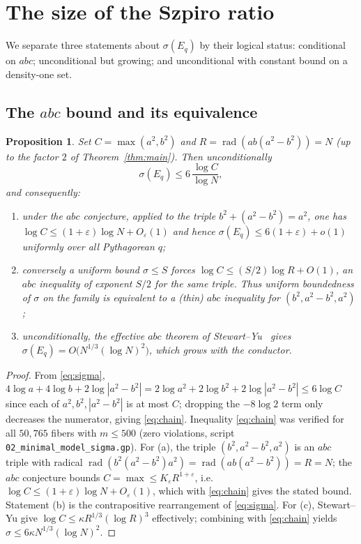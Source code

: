 \documentclass[11pt,reqno]{amsart}
\theoremstyle{plain}
\newtheorem{proposition}[theorem]{Proposition}
\theoremstyle{definition}
\newcommand{\rad}{\operatorname{rad}}
\begin{document}
\section{The size of the Szpiro ratio}

We separate three statements about $\sigma(E_q)$ by their logical status:
conditional on $abc$; unconditional but growing; and unconditional with constant
bound on a density-one set.

\subsection{The $abc$ bound and its equivalence}

\begin{proposition}\label{prop:abc}
Set $C=\max(a^2,b^2)$ and $R=\rad(ab(a^2-b^2))=N$ \textup{(}up to the factor $2$
of Theorem~\ref{thm:main}\textup{)}. Then unconditionally
\begin{equation}\label{eq:chain}
  \sigma(E_q)\le 6\,\frac{\log C}{\log N},
\end{equation}
and consequently:
\begin{enumerate}
\item[\textup{(a)}] under the $abc$ conjecture, applied to the triple
$b^2+(a^2-b^2)=a^2$, one has $\log C\le(1+\varepsilon)\log N+O_\varepsilon(1)$ and
hence $\sigma(E_q)\le 6(1+\varepsilon)+o(1)$ uniformly over all Pythagorean $q$;
\item[\textup{(b)}] conversely a uniform bound $\sigma\le S$ forces
$\log C\le(S/2)\log R+O(1)$, an $abc$ inequality of exponent $S/2$ for the same
triple. Thus uniform boundedness of $\sigma$ on the family is equivalent to a
\textup{(}thin\textup{)} $abc$ inequality for $(b^2,a^2-b^2,a^2)$;
\item[\textup{(c)}] unconditionally, the effective $abc$ theorem of
Stewart--Yu~\cite{stewartyu} gives $\sigma(E_q)=O\!\bigl(N^{1/3}(\log N)^2\bigr)$,
which grows with the conductor.
\end{enumerate}
\end{proposition}

\begin{proof}
From \eqref{eq:sigma}, $4\log a+4\log b+2\log|a^2-b^2|
=2\log a^2+2\log b^2+2\log|a^2-b^2|\le 6\log C$ since each of $a^2,b^2,|a^2-b^2|$
is at most $C$; dropping the $-8\log2$ term only decreases the numerator, giving
\eqref{eq:chain}. Inequality \eqref{eq:chain} was verified for all $50{,}765$
fibers with $m\le500$ (zero violations, script
\texttt{02\_minimal\_model\_sigma.gp}). For (a), the triple $(b^2,a^2-b^2,a^2)$
is an $abc$ triple with radical $\rad(b^2(a^2-b^2)a^2)=\rad(ab(a^2-b^2))=R=N$;
the $abc$ conjecture bounds $C=\max\le K_\varepsilon R^{1+\varepsilon}$, i.e.\
$\log C\le(1+\varepsilon)\log N+O_\varepsilon(1)$, which with \eqref{eq:chain}
gives the stated bound. Statement (b) is the contrapositive rearrangement of
\eqref{eq:sigma}. For (c), Stewart--Yu give
$\log C\le\kappa R^{1/3}(\log R)^3$ effectively; combining with \eqref{eq:chain}
yields $\sigma\le 6\kappa N^{1/3}(\log N)^2$.
\end{proof}
\end{document}
